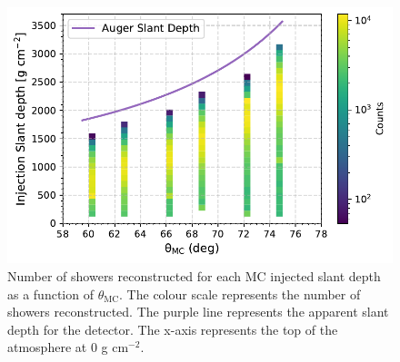 \begin{figure}[t!]
  \centering
  \includegraphics[width=14.5cm]{thesis_figures/Nu_analysis/MC_control/Slant_Depth_Profile_MC.pdf}
  \caption{Number of showers reconstructed for each MC injected slant depth as a function of $\theta_{\text{MC}}$. The colour scale represents the number of showers reconstructed. The purple line represents the apparent slant depth for the detector. The x-axis represents the top of the atmosphere at 0 g cm$^{-2}$.}
  \label{fig:Slant_depth_rec}
\end{figure}

